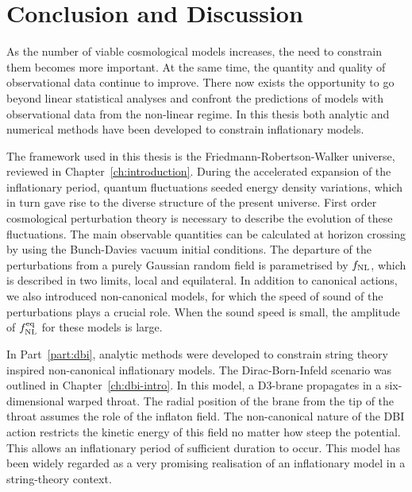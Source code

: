 % 


\chapter{Conclusion and Discussion}
\label{ch:conclusions}

As the number of viable cosmological models increases, the need to constrain
them becomes more
important. At the same time, the quantity and quality of observational data continue
to improve.
There now exists the opportunity to go beyond linear statistical analyses
and confront the predictions of models with observational data from the non-linear
regime. In this thesis both analytic and numerical methods have been developed to
constrain inflationary models.

The framework used in this thesis is the Friedmann-Robertson-Walker universe,
reviewed in Chapter~\ref{ch:introduction}. During the accelerated expansion of the
inflationary period, quantum fluctuations seeded energy density variations, which in turn
gave rise to the diverse structure of the present universe. First order
cosmological perturbation theory
is necessary to describe the evolution of these fluctuations. The main observable
quantities can be calculated at horizon crossing by using the Bunch-Davies vacuum
initial conditions. The departure of the perturbations from a purely Gaussian random
field is parametrised by $f_{\mathrm{NL}}$, which is described in two limits, local and
equilateral. 
In addition to canonical actions, we also introduced
non-canonical models, for which the speed of sound of the perturbations plays a
crucial role. When the sound speed is small, the amplitude of $f_{\mathrm{NL}}^{\mathrm{eq}}$ for these
models is large. 



In Part~\ref{part:dbi}, analytic methods were developed to constrain
string theory inspired non-canonical inflationary models. The Dirac-Born-Infeld
scenario was
outlined in Chapter~\ref{ch:dbi-intro}. In this model, a D3-brane propagates in a
six-dimensional warped throat. The radial position of the brane from the tip of the
throat assumes the role of the inflaton field. The non-canonical nature of the DBI
action restricts the kinetic energy of this field no matter how steep the potential.
This allows an inflationary period of sufficient duration to occur.
This model has been widely regarded as a very promising realisation of an
inflationary
model in a string-theory context.

